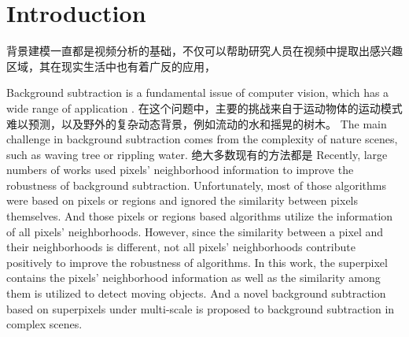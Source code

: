 \documentclass[runningheads,a4paper]{llncs}
\begin{document}
\section{Introduction}
背景建模一直都是视频分析的基础，不仅可以帮助研究人员在视频中提取出感兴趣区域，其在现实生活中也有着广反的应用，

Background subtraction is a fundamental issue of computer vision,
which has a wide range of application \cite{2014_CSR_reviews} \cite{2014_CCPR_RefPaper}.
在这个问题中，主要的挑战来自于运动物体的运动模式难以预测，以及野外的复杂动态背景，例如流动的水和摇晃的树木。
The main challenge in background subtraction comes from the complexity
of nature scenes, such as waving tree or rippling water.
绝大多数现有的方法都是
Recently, large numbers of works used pixels' neighborhood information to
improve the robustness of background subtraction.
Unfortunately, most of those algorithms were based on pixels or regions and
ignored the similarity between pixels themselves.
And those pixels or regions based algorithms utilize the information of all
pixels' neighborhoods.
However, since the similarity between a pixel and their neighborhoods is
different,
%
not all pixels' neighborhoods contribute positively to improve the robustness of algorithms.
In this work, the superpixel contains the pixels'
neighborhood information as well as the similarity among them is utilized to
detect moving objects.
And a novel background subtraction based on superpixels under multi-scale is
proposed to background subtraction in complex scenes.
\end{document}

